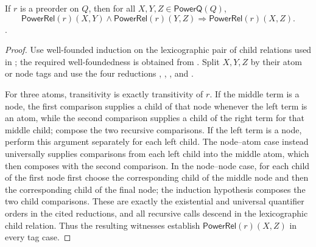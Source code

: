 \begin{lemma}
If $r$ is a preorder on $Q$, then for all
$X,Y,Z\in\mathsf{PowerQ}(Q)$,
\[
\mathsf{PowerRel}(r)(X,Y)\land\mathsf{PowerRel}(r)(Y,Z)
\Longrightarrow\mathsf{PowerRel}(r)(X,Z).
\].
\end{lemma}
\begin{proof}
Use well-founded induction on the lexicographic pair of child relations used
in ; the required well-foundedness is obtained from
.  Split $X,Y,Z$ by their atom or node tags
and use the four reductions ,
, , and
.

For three atoms, transitivity is exactly transitivity of $r$.  If the middle
term is a node, the first comparison supplies a child of that node whenever
the left term is an atom, while the second comparison supplies a child of
the right term for that middle child; compose the two recursive comparisons.
If the left term is a node, perform this argument separately for each left
child.  The node--atom case instead universally supplies comparisons from
each left child into the middle atom, which then composes with the second
comparison.  In the node--node case, for each child of the first node first
choose the corresponding child of the middle node and then the corresponding
child of the final node; the induction hypothesis composes the two child
comparisons.  These are exactly the existential and universal quantifier
orders in the cited reductions, and all recursive calls descend in the
lexicographic child relation.  Thus the resulting witnesses establish
$\mathsf{PowerRel}(r)(X,Z)$ in every tag case.
\end{proof}
